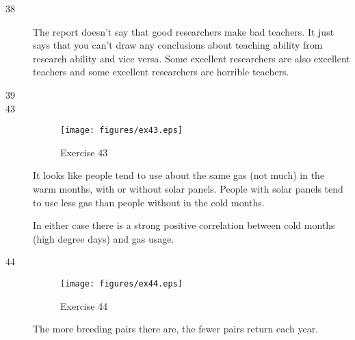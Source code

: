\documentclass{exam}
\begin{document}
\begin{description}

      \item[38]
        The report doesn't say that good researchers make bad teachers.  It just says that
        you can't draw any conclusions about teaching ability from research ability and
        vice versa.  Some excellent researchers are also excellent teachers and some
        excellent researchers are horrible teachers.

      \item[39]

      \item[43]
        \begin{figure}[H]
          \centering
          \texttt{[image: figures/ex43.eps]}
          \caption{Exercise 43}
        \end{figure}

        It looks like people tend to use about the same gas (not much) in the warm months,
        with or without solar panels.  People with solar panels tend to use less gas than
        people without in the cold months.

        In either case there is a strong positive correlation between cold months (high
        degree days) and gas usage.

      \item[44]
        \begin{figure}[H]
          \centering
          \texttt{[image: figures/ex44.eps]}
          \caption{Exercise 44}
        \end{figure}

        The more breeding pairs there are, the fewer pairs return each year.
    \end{description}
\end{document}
